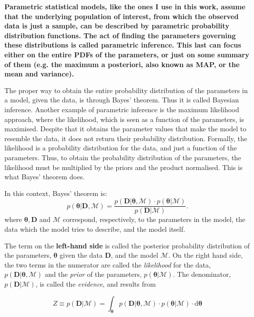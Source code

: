 \textbf{Parametric statistical models, like the ones I use in this work, assume that the underlying population of interest, from which the observed data is just a sample, can be described by parametric probability distribution functions. The act of finding the parameters governing these distributions is called parametric inference. This last can focus either on the entire PDFs of the parameters, or just on some summary of them (e.g. the maximum a posteriori, also known as MAP, or the mean and variance).}

The proper way to obtain the entire probability distribution of the parameters in a model, given the data, is through Bayes' theorem. Thus it is called Bayesian inference. Another example of parametric inference is the maximum likelihood approach, where the likelihood, which is seen as a function of the parameters, is maximised. Despite that it obtains the parameter values that make the model to resemble the data, it does not return their probability distribution. Formally, the likelihood is a probability distribution for the data, and just a function of the parameters. Thus, to obtain the probability distribution of the parameters, the likelihood must be multiplied by the priors and the product normalised. This is what Bayes' theorem does.

In this context, Bayes' theorem is:
\begin{equation}
p(\boldsymbol{\theta}|\mathbf{D},\mathcal{M}) = \frac{p(\mathbf{D}|\boldsymbol{\theta},\mathcal{M})\cdot p(\boldsymbol{\theta}|\mathcal{M})}{p(\mathbf{D}|\mathcal{M})}.
\end{equation}
where $\boldsymbol{\theta},\mathbf{D}$ and $\mathcal{M}$ correspond, respectively, to the parameters in the model, the data which the model tries to describe, and the model itself. 

The term on the \textbf{left-hand side} is called the posterior probability distribution of the parameters, $\boldsymbol{\theta}$ given the data $\mathbf{D}$, and the model $\mathcal{M}$. On the right hand side, the two terms in the numerator are called the \emph{likelihood} for the data, $p(\mathbf{D}|\boldsymbol{\theta},\mathcal{M})$ and the \emph{prior} of the parameters, $p(\boldsymbol{\theta}|\mathcal{M})$. The denominator, $p(\mathbf{D}|\mathcal{M})$, is called the \emph{evidence}, and results from

\begin{equation}
\label{eq:evidence}
Z \equiv p(\mathbf{D}|\mathcal{M}) = \int_{\boldsymbol{\theta}} p(\mathbf{D}|\boldsymbol{\theta},\mathcal{M})\cdot p(\boldsymbol{\theta}|\mathcal{M})\cdot \mathrm{d}\boldsymbol{\theta}
\end{equation} 

